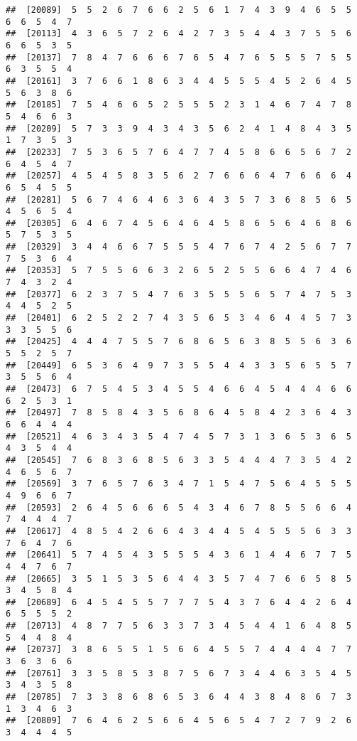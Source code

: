\documentclass[
]{book}
\begin{document}
\begin{verbatim}
##  [20089]  5  5  2  6  7  6  6  2  5  6  1  7  4  3  9  4  6  5  5  6  6  5  4  7
##  [20113]  4  3  6  5  7  2  6  4  2  7  3  5  4  4  3  7  5  5  6  6  6  5  3  5
##  [20137]  7  8  4  7  6  6  6  7  6  5  4  7  6  5  5  5  7  5  5  6  3  5  5  4
##  [20161]  3  7  6  6  1  8  6  3  4  4  5  5  5  4  5  2  6  4  5  5  6  3  8  6
##  [20185]  7  5  4  6  6  5  2  5  5  5  2  3  1  4  6  7  4  7  8  5  4  6  6  3
##  [20209]  5  7  3  3  9  4  3  4  3  5  6  2  4  1  4  8  4  3  5  1  7  3  5  3
##  [20233]  7  5  3  6  5  7  6  4  7  7  4  5  8  6  6  5  6  7  2  6  4  5  4  7
##  [20257]  4  5  4  5  8  3  5  6  2  7  6  6  6  4  7  6  6  6  4  6  5  4  5  5
##  [20281]  5  6  7  4  6  4  6  3  6  4  3  5  7  3  6  8  5  6  5  4  5  6  5  4
##  [20305]  6  4  6  7  4  5  6  4  6  4  5  8  6  5  6  4  6  8  6  5  7  5  3  5
##  [20329]  3  4  4  6  6  7  5  5  5  4  7  6  7  4  2  5  6  7  7  7  5  3  6  4
##  [20353]  5  7  5  5  6  6  3  2  6  5  2  5  5  6  6  4  7  4  6  7  4  3  2  4
##  [20377]  6  2  3  7  5  4  7  6  3  5  5  5  6  5  7  4  7  5  3  4  4  5  2  5
##  [20401]  6  2  5  2  2  7  4  3  5  6  5  3  4  6  4  4  5  7  3  3  3  5  5  6
##  [20425]  4  4  4  7  5  5  7  6  8  6  5  6  3  8  5  5  6  3  6  5  5  2  5  7
##  [20449]  6  5  3  6  4  9  7  3  5  5  4  4  3  3  5  6  5  5  7  3  5  5  6  4
##  [20473]  6  7  5  4  5  3  4  5  5  4  6  6  4  5  4  4  4  6  6  6  2  5  3  1
##  [20497]  7  8  5  8  4  3  5  6  8  6  4  5  8  4  2  3  6  4  3  6  6  4  4  4
##  [20521]  4  6  3  4  3  5  4  7  4  5  7  3  1  3  6  5  3  6  5  4  3  5  4  4
##  [20545]  7  6  8  3  6  8  5  6  3  3  5  4  4  4  7  3  5  4  2  4  6  5  6  7
##  [20569]  3  7  6  5  7  6  3  4  7  1  5  4  7  5  6  4  5  5  5  4  9  6  6  7
##  [20593]  2  6  4  5  6  6  6  5  4  3  4  6  7  8  5  5  6  6  4  7  4  4  4  7
##  [20617]  4  8  5  4  2  6  6  4  3  4  4  5  4  5  5  5  6  3  3  7  6  4  7  6
##  [20641]  5  7  4  5  4  3  5  5  5  4  3  6  1  4  4  6  7  7  5  4  4  7  6  7
##  [20665]  3  5  1  5  3  5  6  4  4  3  5  7  4  7  6  6  5  8  5  3  4  5  8  4
##  [20689]  6  4  5  4  5  5  7  7  7  5  4  3  7  6  4  4  2  6  4  6  5  5  5  2
##  [20713]  4  8  7  7  5  6  3  3  7  3  4  5  4  4  1  6  4  8  5  5  4  4  8  4
##  [20737]  3  8  6  5  5  1  5  6  6  4  5  5  7  4  4  4  4  7  7  3  6  3  6  6
##  [20761]  3  3  5  8  5  3  8  7  5  6  7  3  4  4  6  3  5  4  5  3  4  3  5  8
##  [20785]  7  3  3  8  6  8  6  5  3  6  4  4  3  8  4  8  6  7  3  1  3  4  6  3
##  [20809]  7  6  4  6  2  5  6  6  4  5  6  5  4  7  2  7  9  2  6  3  4  4  4  5

\end{verbatim}
\end{document}
